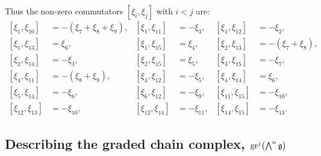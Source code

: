 Thus the non-zero commutators $[\xi_{i},\xi_{j}]$ with $i<j$ are:
\begin{equation}
  \label{eq:xi_ij-SL4}
  \begin{aligned}
    [\xi_{1},\xi_{10}] &= -(\xi_{7}+\xi_{8}+\xi_{9}), & [\xi_{1},\xi_{11}] &= -\xi_{3}, & [\xi_{1},\xi_{12}] &= -\xi_{2}, \\
    [\xi_{1},\xi_{13}] &= \xi_{6}, & [\xi_{1},\xi_{15}] &= \xi_{4}, & [\xi_{2},\xi_{13}] &= -(\xi_{7}+\xi_{8}), \\
    [\xi_{2},\xi_{14}] &= -\xi_{3}, & [\xi_{2},\xi_{15}] &= \xi_{5}, & [\xi_{3},\xi_{15}] &= -\xi_{7}, \\
    [\xi_{4},\xi_{11}] &= -(\xi_{8}+\xi_{9}), & [\xi_{4},\xi_{12}] &= -\xi_{5}, & [\xi_{4},\xi_{14}] &= \xi_{6}, \\
    [\xi_{5},\xi_{14}] &= -\xi_{8}, & [\xi_{6},\xi_{12}] &= -\xi_{9}, & [\xi_{11},\xi_{15}] &= -\xi_{10}, \\
    [\xi_{12},\xi_{13}] &= -\xi_{10}, & [\xi_{12},\xi_{14}] &= -\xi_{11}, & [\xi_{14},\xi_{15}] &= -\xi_{13}.
  \end{aligned}
\end{equation}

\subsection{Describing the graded chain complex, \texorpdfstring{$\operatorname{gr}^{j}\bigl(\bigwedge^{n}\mathfrak{g}\bigr)$}{grj(wedge-n g)}}%
\label{subsec:graded-complex-SL4}

